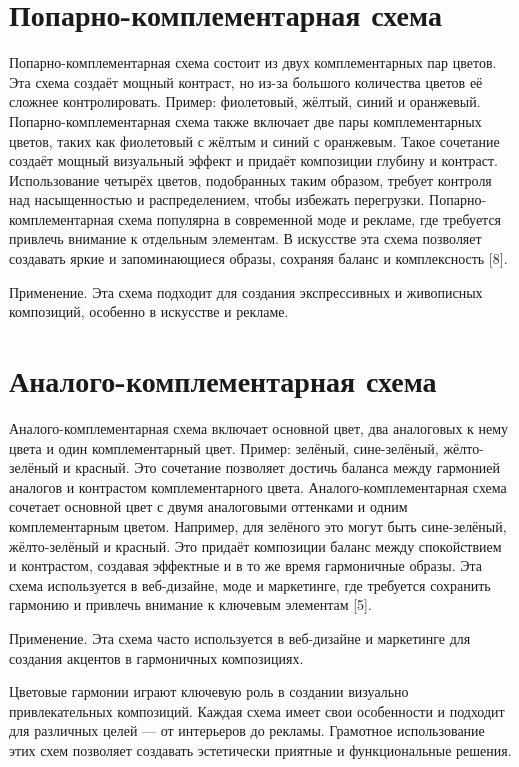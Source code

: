 \documentclass[bachelor, och, referat]{SCWorks}
\begin{document}
\section{Попарно-комплементарная схема}
Попарно-комплементарная схема состоит из двух комплементарных пар цветов. Эта схема создаёт мощный контраст, но из-за большого количества цветов её сложнее контролировать. Пример: фиолетовый, жёлтый, синий и оранжевый.
Попарно-комплементарная схема также включает две пары комплементарных цветов, таких как фиолетовый с жёлтым и синий с оранжевым. Такое сочетание создаёт мощный визуальный эффект и придаёт композиции глубину и контраст. Использование четырёх цветов, подобранных таким образом, требует контроля над насыщенностью и распределением, чтобы избежать перегрузки.
Попарно-комплементарная схема популярна в современной моде и рекламе, где требуется привлечь внимание к отдельным элементам. В искусстве эта схема позволяет создавать яркие и запоминающиеся образы, сохраняя баланс и комплексность [8].

Применение. Эта схема подходит для создания экспрессивных и живописных композиций, особенно в искусстве и рекламе.

\section{Аналого-комплементарная схема}
Аналого-комплементарная схема включает основной цвет, два аналоговых к нему цвета и один комплементарный цвет. Пример: зелёный, сине-зелёный, жёлто-зелёный и красный. Это сочетание позволяет достичь баланса между гармонией аналогов и контрастом комплементарного цвета.
Аналого-комплементарная схема сочетает основной цвет с двумя аналоговыми оттенками и одним комплементарным цветом. Например, для зелёного это могут быть сине-зелёный, жёлто-зелёный и красный. Это придаёт композиции баланс между спокойствием и контрастом, создавая эффектные и в то же время гармоничные образы.
Эта схема используется в веб-дизайне, моде и маркетинге, где требуется сохранить гармонию и привлечь внимание к ключевым элементам [5].

Применение. Эта схема часто используется в веб-дизайне и маркетинге для создания акцентов в гармоничных композициях.

\conclusion
Цветовые гармонии играют ключевую роль в создании визуально привлекательных композиций. Каждая схема имеет свои особенности и подходит для различных целей — от интерьеров до рекламы. Грамотное использование этих схем позволяет создавать эстетически приятные и функциональные решения.
\end{document}
